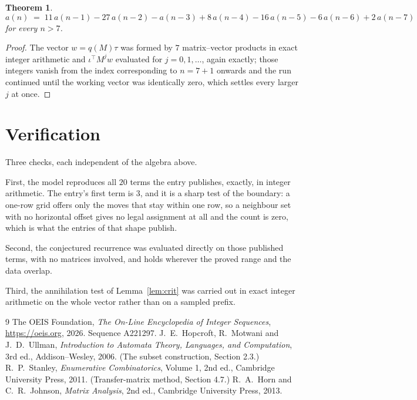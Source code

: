 \documentclass[11pt,a4paper]{article}
\theoremstyle{plain}
\newtheorem{theorem}{Theorem}
\theoremstyle{definition}
\begin{document}
\begin{theorem}
\[
a(n)\;=\;11\,a(n-1) - 27\,a(n-2) - a(n-3) + 8\,a(n-4) - 16\,a(n-5) - 6\,a(n-6) + 2\,a(n-7)
\]
for every $n>7$.
\end{theorem}

\begin{proof}
The vector $w=q(M)\tau$ was formed by $7$ matrix--vector products in exact integer
arithmetic and $\iota^{\!\top}M^{j}w$ evaluated for $j=0,1,\dots$, again exactly; those
integers vanish from the index corresponding to $n=7+1$ onwards and the run continued
until the working vector was identically zero, which settles every larger $j$ at once.
\end{proof}

\section{Verification}

Three checks, each independent of the algebra above.

First, the model reproduces all $20$ terms the entry publishes, exactly, in integer
arithmetic. The entry's first term is $3$, and it is a sharp test of the boundary: a
one-row grid offers only the moves that stay within one row, so a neighbour set with no
horizontal offset gives no legal assignment at all and the count is zero, which is what the
entries of that shape publish.

Second, the conjectured recurrence was evaluated directly on those published terms, with no
matrices involved, and holds wherever the proved range and the data overlap.

Third, the annihilation test of Lemma~\ref{lem:crit} was carried out in exact integer
arithmetic on the whole vector rather than on a sampled prefix.

\begin{thebibliography}{9}
 The OEIS Foundation, \emph{The On-Line Encyclopedia of Integer
Sequences}, \url{https://oeis.org}, 2026. Sequence A221297.
 J.~E.~Hopcroft, R.~Motwani and J.~D.~Ullman, \emph{Introduction to Automata
Theory, Languages, and Computation}, 3rd ed., Addison--Wesley, 2006. (The subset
construction, Section 2.3.)
 R.~P.~Stanley, \emph{Enumerative Combinatorics}, Volume 1, 2nd ed.,
Cambridge University Press, 2011. (Transfer-matrix method, Section 4.7.)
 R.~A.~Horn and C.~R.~Johnson, \emph{Matrix Analysis}, 2nd ed., Cambridge
University Press, 2013.
\end{thebibliography}
\end{document}
